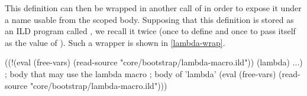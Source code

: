 This definition can then be wrapped in another call of  in order to expose
it under a  name usable from the scoped body. Supposing that
this definition is stored as an ILD program called ,
we recall it twice (once to define  and once to pass itself as the
value of ). Such a wrapper is shown in \cref{lambda-wrap}.
\begin{listingbox}\begin{ildcode}
((!(eval (free-vars)
    (read-source
      "core/bootstrap/lambda-macro.ild"))
 (lambda)
  ...) ; body that may use the lambda macro
  ; body of 'lambda'
  (eval (free-vars)
    (read-source
      "core/bootstrap/lambda-macro.ild")))
\end{ildcode}\end{listingbox}
\label{lambda-wrap}

